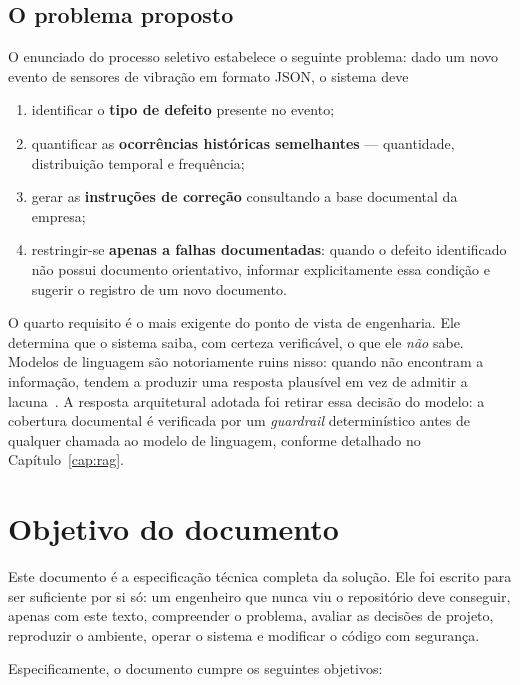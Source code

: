 \subsection{O problema proposto}

O enunciado do processo seletivo estabelece o seguinte problema: dado um novo
evento de sensores de vibração em formato JSON, o sistema deve

\begin{enumerate}
  \item identificar o \textbf{tipo de defeito} presente no evento;
  \item quantificar as \textbf{ocorrências históricas semelhantes} ---
    quantidade, distribuição temporal e frequência;
  \item gerar as \textbf{instruções de correção} consultando a base documental
    da empresa;
  \item restringir-se \textbf{apenas a falhas documentadas}: quando o defeito
    identificado não possui documento orientativo, informar explicitamente essa
    condição e sugerir o registro de um novo documento.
\end{enumerate}

O quarto requisito é o mais exigente do ponto de vista de engenharia. Ele
determina que o sistema saiba, com certeza verificável, o que ele \emph{não}
sabe. Modelos de linguagem são notoriamente ruins nisso: quando não encontram
a informação, tendem a produzir uma resposta plausível em vez de
admitir a lacuna~\cite{ji2023hallucination}. A resposta arquitetural adotada foi
retirar essa decisão do modelo: a cobertura documental é verificada por um
\textit{guardrail} determinístico antes de qualquer chamada ao modelo de
linguagem, conforme detalhado no Capítulo~\ref{cap:rag}.

\section{Objetivo do documento}

Este documento é a especificação técnica completa da solução. Ele foi escrito
para ser suficiente por si só: um engenheiro que nunca viu o repositório deve
conseguir, apenas com este texto, compreender o problema, avaliar as decisões de
projeto, reproduzir o ambiente, operar o sistema e modificar o código com
segurança.

Especificamente, o documento cumpre os seguintes objetivos:

